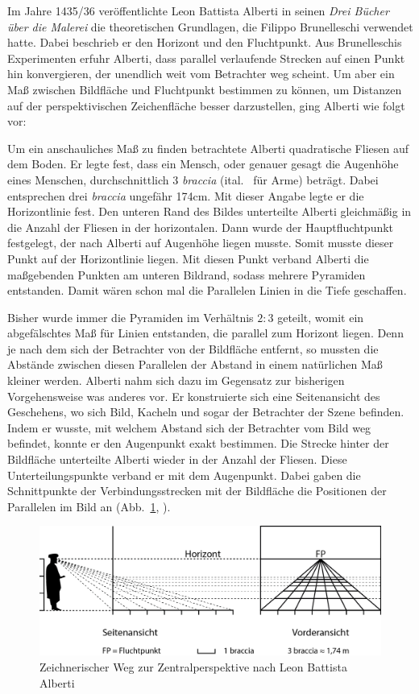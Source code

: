 \documentclass[12pt,a4paper]{article}
\begin{document}
Im Jahre 1435/36 veröffentlichte Leon Battista Alberti in seinen \textit{Drei Bücher über die Malerei} die theoretischen Grundlagen, die Filippo Brunelleschi verwendet hatte. Dabei beschrieb er den Horizont und den Fluchtpunkt. Aus Brunelleschis Experimenten erfuhr Alberti, dass parallel verlaufende Strecken auf einen Punkt hin konvergieren, der unendlich weit vom Betrachter weg scheint. Um aber ein Maß zwischen Bildfläche und Fluchtpunkt bestimmen zu können, um Distanzen auf der perspektivischen Zeichenfläche besser darzustellen, ging Alberti wie folgt vor:

Um ein anschauliches Maß zu finden betrachtete Alberti quadratische Fliesen auf dem Boden. Er legte fest, dass ein Mensch, oder genauer gesagt die Augenhöhe eines Menschen, durchschnittlich 3 \textit{braccia} (ital.~ für \glqq Arme\grqq) beträgt. Dabei entsprechen drei \textit{braccia} ungefähr 174cm. Mit dieser Angabe legte er die Horizontlinie fest. Den unteren Rand des Bildes unterteilte Alberti gleichmäßig in die Anzahl der Fliesen in der horizontalen. Dann wurde der Hauptfluchtpunkt festgelegt, der nach Alberti auf Augenhöhe liegen musste. Somit musste dieser Punkt auf der Horizontlinie liegen. Mit diesen Punkt verband Alberti die maßgebenden Punkten am unteren Bildrand, sodass mehrere Pyramiden entstanden. Damit wären schon mal die Parallelen Linien in die Tiefe geschaffen.

Bisher wurde immer die Pyramiden im Verhältnis $2 : 3$ geteilt, womit ein abgefälschtes Maß für Linien entstanden, die parallel zum Horizont liegen. Denn je nach dem sich der Betrachter von der Bildfläche entfernt, so mussten die Abstände zwischen diesen Parallelen der Abstand in einem natürlichen Maß kleiner werden. Alberti nahm sich dazu im Gegensatz zur bisherigen Vorgehensweise was anderes vor. Er konstruierte sich eine Seitenansicht des Geschehens, wo sich Bild, Kacheln und sogar der Betrachter der Szene befinden. Indem er wusste, mit welchem Abstand sich der Betrachter vom Bild weg befindet, konnte er den Augenpunkt exakt bestimmen. Die Strecke hinter der Bildfläche unterteilte Alberti wieder in der Anzahl der Fliesen. Diese Unterteilungspunkte verband er mit dem Augenpunkt. Dabei gaben die Schnittpunkte der Verbindungsstrecken mit der Bildfläche die Positionen der Parallelen im Bild an (Abb.~\ref{fig:braccia}, \citep[vgl.][S.~31ff]{perspektive}).

\begin{figure}[htbp] 
\centering
\includegraphics[width=\textwidth]{Bilder/braccia.png}
\caption{Zeichnerischer Weg zur Zentralperspektive nach Leon Battista Alberti}
\label{fig:braccia}
\end{figure}
\end{document}
